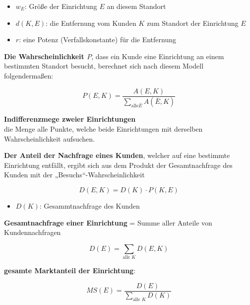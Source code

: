       \begin{itemize}
        \item $w_E$: Größe der Einrichtung $E$ an diesem Standort
        \item $d(K, E)$: die Entfernung vom Kunden $K$ zum Standort der Einrichtung $E$
        \item $r$: eine Potenz (Verfallskonstante) für die Entfernung
      \end{itemize}

      \par \textbf{Die Wahrscheinlichkeit $P$}, dass ein Kunde eine Einrichtung an einem bestimmten Standort besucht, berechnet sich nach diesem Modell folgendermaßen:

      \begin{equation}
        P(E, K) = \frac{A(E, K)}{\sum_{\text{alle} \bar{E}}A(\bar{E}, K)}
      \end{equation}

      \begin{defn}
        \textbf{Indifferenzmege zweier Einrichtungen}\\
        die Menge alle Punkte, welche beide Einrichtungen mit derselben Wahrscheinlichkeit aufsuchen.
      \end{defn}

      \par \textbf{Der Anteil der Nachfrage eines Kunden}, welcher auf eine bestimmte Einrichtung entfällt, ergibt sich aus dem Produkt der Gesamtnachfrage des Kunden mit der „Besuchs“-Wahrscheinlichkeit

      \begin{equation}
        D(E, K) = D(K) \cdot P(K, E)
      \end{equation}
      \begin{itemize}
        \item $D(K)$: Gesammtnachfrage des Kunden
      \end{itemize}

      \par \textbf{Gesamtnachfrage einer Einrichtung} = Summe aller Anteile von Kundennachfragen

      \begin{equation}
        D(E) = \sum_{\text{alle } K}D(E, K)
      \end{equation}

      \par \textbf{gesamte Marktanteil der Einrichtung}:

      \begin{equation}
        MS(E) = \frac{D(E)}{\sum_{\text{alle } K}D(K)}
      \end{equation}

